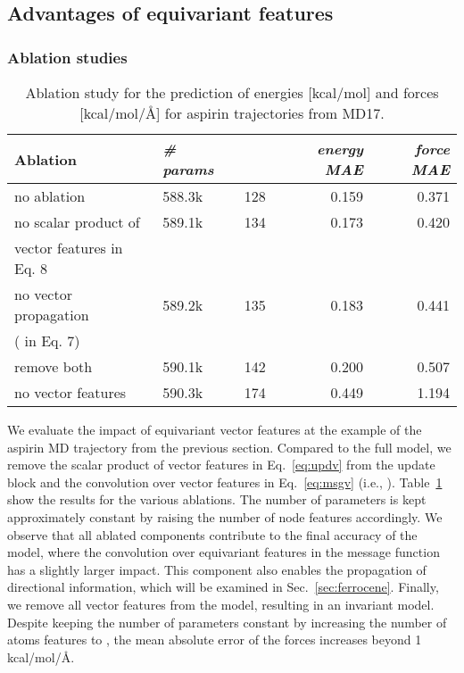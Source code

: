 \documentclass[reprint,
amsmath,amssymb,
 aip,jcp
]{revtex4-2}
\newcommand{\new}[1]{#1}
\begin{document}
\subsection{Advantages of equivariant features}
\subsubsection{Ablation studies}
\begin{table}
\begin{center}
\begin{scriptsize}
\caption{Ablation study for the prediction of energies [kcal/mol] and forces [kcal/mol/{\AA}] for aspirin trajectories from MD17.\label{tab:abl}}
\begin{tabular}{lllrr} \toprule
\textbf{Ablation}    & \textbf{\textit{\# params}} & \textbf{} & \textbf{\textit{energy MAE}} & \textbf{\textit{force MAE}} \\ \midrule
no ablation & 588.3k & 128 & 0.159 & 0.371 \\ \midrule
no scalar product of & 589.1k & 134 & 0.173 & 0.420 \\
vector features in Eq. 8 \\
no vector propagation   & 589.2k & 135 & 0.183 & 0.441 \\
( in Eq. 7) \\
remove both & 590.1k & 142  & 0.200 & 0.507 \\  \midrule
no vector features & 590.3k & 174 & 0.449 & 1.194 \\ 
\bottomrule
\end{tabular}
\end{scriptsize}
\end{center}
\end{table}
\new{We evaluate the impact of equivariant vector features at the example of the aspirin MD trajectory from the previous section.
Compared to the full model, we remove the scalar product of vector features in Eq.~\ref{eq:updv} from the update block and the convolution over vector features in Eq.~\ref{eq:msgv} (i.e., ).
Table~\ref{tab:abl} show the results for the various ablations.
The number of parameters is kept approximately constant by raising the number of node features  accordingly.
We observe that all ablated components contribute to the final accuracy of the model, where the convolution over equivariant features in the message function has a slightly larger impact.
This component also enables the propagation of directional information, which will be examined in Sec.~\ref{sec:ferrocene}.
Finally, we remove all vector features from the model, resulting in an invariant model.
Despite keeping the number of parameters constant by increasing the number of atoms features to , the mean absolute error of the forces increases beyond 1 kcal/mol/{\AA}.
}
\end{document}
